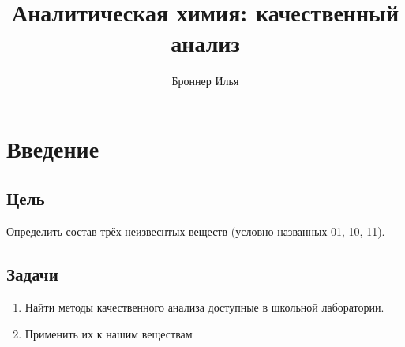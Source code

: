 \documentclass[a4paper,14pt,titlepage,twoside]{article}
\title{Аналитическая химия: качественный анализ}
\author{Броннер Илья}
\begin{document}
    \setcounter{page}{0}
    \tableofcontents
    \newpage

    \section{Введение}
        \subsection{Цель}
            Определить состав трёх неизвеснтых веществ (условно названных 01, 10, 11).

        \subsection{Задачи}
            \begin{enumerate}
                \item
                    Найти методы качественного анализа доступные в школьной лаборатории.
                \item 
                    Применить их к нашим веществам
            \end{enumerate}
\end{document}
